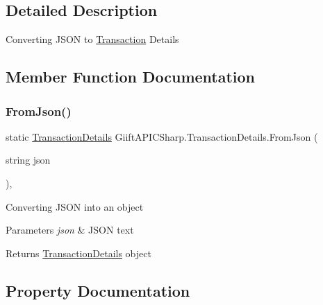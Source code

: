 \subsection{Detailed Description}
Converting J\+S\+ON to \hyperlink{class_giift_a_p_i_c_sharp_1_1_transaction}{Transaction} Details 



\subsection{Member Function Documentation}
\mbox{\label{class_giift_a_p_i_c_sharp_1_1_transaction_details_a58cdd48707822d0f8d43d67942635e5b}} 
\subsubsection{\texorpdfstring{From\+Json()}{FromJson()}}
{\footnotesize\ttfamily static \hyperlink{class_giift_a_p_i_c_sharp_1_1_transaction_details}{Transaction\+Details} Giift\+A\+P\+I\+C\+Sharp.\+Transaction\+Details.\+From\+Json (\begin{DoxyParamCaption}\item[{string}]{json }\end{DoxyParamCaption})\hspace{0.3cm}{\ttfamily [inline]}, {\ttfamily [static]}}



Converting J\+S\+ON into an object 


\begin{DoxyParams}{Parameters}
{\em json} & J\+S\+ON text\\
\hline
\end{DoxyParams}
\begin{DoxyReturn}{Returns}
\hyperlink{class_giift_a_p_i_c_sharp_1_1_transaction_details}{Transaction\+Details} object
\end{DoxyReturn}


\subsection{Property Documentation}
\mbox{\label{class_giift_a_p_i_c_sharp_1_1_transaction_details_aef3030206ce28ab7bf0347a1015fe800}} 
